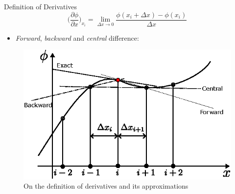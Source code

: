 \begin{frame}{Definition of Derivatives}
\[\bigg( \frac{\partial \phi}{\partial x}\bigg)_{x_{i}} = \lim_{\Delta x \to 0}\frac{\phi(x_{i}+\Delta x)-\phi(x_{i})}{\Delta x}\]
\begin{itemize}
    \item \textit{Forward}, \textit{backward} and \textit{central} difference:
\end{itemize}
    \begin{figure}[H]
        \centering
        \includegraphics{imgs/def-of-derivative.eps}
        \caption{On the definition of derivatives and its approximations}
        \label{fig:my_label}
    \end{figure}
\end{frame}